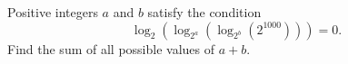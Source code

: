 Positive integers $a$ and $b$ satisfy the condition \[\log_2(\log_{2^a}(\log_{2^b}(2^{1000})))=0.\] Find the sum of all possible values of $a+b$.